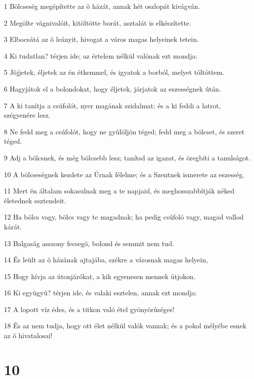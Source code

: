 \par 1 Bölcseség megépítette az õ házát, annak hét oszlopát kivágván.
\par 2 Megölte vágnivalóit, kitöltötte borát, asztalát is elkészítette.
\par 3 Elbocsátá az õ leányit, hivogat a város magas helyeinek tetein.
\par 4 Ki tudatlan? térjen ide; az értelem nélkül valónak ezt mondja:
\par 5 Jõjjetek, éljetek az én étkemmel, és igyatok a borból, melyet töltöttem.
\par 6 Hagyjátok el a bolondokat, hogy éljetek, járjatok az eszességnek útán.
\par 7 A ki tanítja a csúfolót, nyer magának szidalmat: és a ki feddi a latrot, szégyenére lesz.
\par 8 Ne fedd meg a csúfolót, hogy ne gyûlöljön téged; fedd meg a bölcset, és szeret téged.
\par 9 Adj a bölcsnek, és még bölcsebb lesz; tanítsd az igazat, és öregbíti a tanulságot.
\par 10 A bölcseségnek kezdete az Úrnak félelme; és a Szentnek ismerete az eszesség.
\par 11 Mert én általam sokasulnak meg a te napjaid, és meghosszabbítják néked életednek esztendeit.
\par 12 Ha bölcs vagy, bölcs vagy te magadnak; ha pedig csúfoló vagy, magad vallod kárát.
\par 13 Balgaság asszony fecsegõ, bolond és semmit nem tud.
\par 14 És leült az õ házának ajtajába, székre a városnak magas helyein,
\par 15 Hogy hívja az útonjárókat, a kik egyenesen mennek útjokon.
\par 16 Ki együgyû? térjen ide, és valaki esztelen, annak ezt mondja:
\par 17 A lopott víz édes, és a titkon való étel gyönyörûséges!
\par 18 És az nem tudja, hogy ott élet nélkül valók vannak; és a pokol mélyébe esnek az õ hivatalosai!

\chapter{10}

